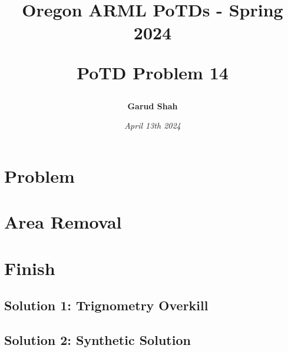 \documentclass{article}
\title{\begin{center}
    Oregon ARML PoTDs - Spring 2024
\end{center}
\begin{center}
    \textbf{PoTD Problem 14}
\end{center}}
\author{\textbf{Garud Shah}}
\date{\textit{April 13th 2024}}
\begin{document}
\maketitle
\newpage
\tableofcontents
\newpage
\section{Problem}

\section{Area Removal}

\section{Finish}
\subsection{Solution 1: Trignometry Overkill}
\subsection{Solution 2: Synthetic Solution}
\end{document}

